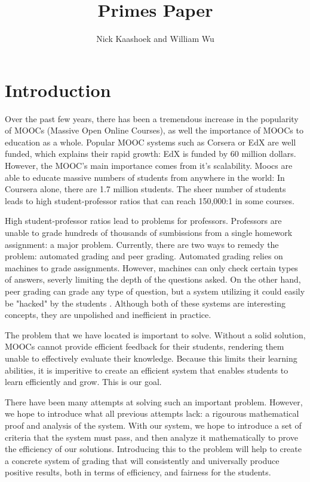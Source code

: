 \documentclass[12pt, Helvetica]{article}
\title{Primes Paper}
\author{Nick Kaashoek and William Wu}
\begin{document}
\maketitle
\section{Introduction}
Over the past few years, there has been a tremendous increase in the popularity of MOOCs (Massive Open Online Courses), as well the importance of MOOCs to education as a whole. Popular MOOC systems such as Corsera or EdX are well funded, which explains their rapid growth: EdX is funded by 60 million dollars\cite{canmoocsreducecc}. However, the MOOC's main importance comes from it's scalability. Moocs are able to educate massive numbers of students from anywhere in the world\cite{makingsenseofmoocs}: In Coursera alone, there are 1.7 million students\cite{swotanalysisofmoocs}. The sheer number of students leads to high student-professor ratios that can reach 150,000:1 in some courses.

High student-professor ratios lead to problems for professors. Professors are unable to grade hundreds of thousands of sumbissions from a single homework assignment: a major problem. Currently, there are two ways to remedy the problem: automated grading and peer grading. Automated grading relies on machines to grade assignments. However, machines can only check certain types of answers, severly limiting the depth of the questions asked\cite{rightandwrongmoocs}. On the other hand, peer grading can grade any type of question, but a system utilizing it could easily be "hacked" by the students \cite{makingsenseofmoocs}. Although both of these systems are interesting concepts, they are unpolished and inefficient in practice.

The problem that we have located is important to solve. Without a solid solution, MOOCs cannot provide efficient feedback for their students, rendering them unable to effectively evaluate their knowledge. Because this limits their learning abilities, it is imperitive to create an efficient system that enables students to learn efficiently and grow. This is our goal.

There have been many attempts at solving such an important problem. However, we hope to introduce what all previous attempts lack: a rigourous mathematical proof and analysis of the system. With our system, we hope to introduce a set of criteria that the system must pass, and then analyze it mathematically to prove the efficiency of our solutions. Introducing this to the problem will help to create a concrete system of grading that will consistently and universally produce positive results, both in terms of efficiency, and fairness for the students.
\end{document}
